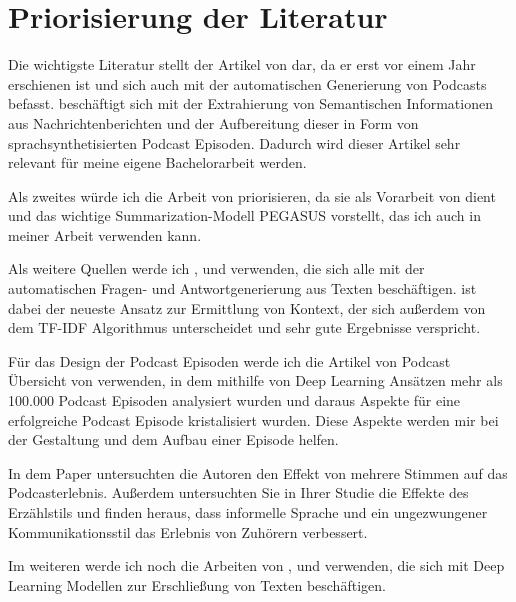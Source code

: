 \chapter{Priorisierung der Literatur}\label{ch:intro}

Die wichtigste Literatur stellt der Artikel von \cite{laban2022} dar, da er erst vor einem Jahr erschienen ist und sich auch mit der automatischen Generierung von Podcasts befasst. \cite{laban2022} beschäftigt sich mit der Extrahierung von Semantischen Informationen aus Nachrichtenberichten und der Aufbereitung dieser in Form von sprachsynthetisierten Podcast Episoden.  Dadurch wird dieser Artikel sehr relevant für meine eigene Bachelorarbeit werden. 

Als zweites würde ich die Arbeit von \cite{zhang2020} priorisieren, da sie als Vorarbeit von \cite{laban2022} dient und das wichtige Summarization-Modell PEGASUS vorstellt, das ich auch in meiner Arbeit verwenden kann.

Als weitere Quellen werde ich \cite{karpukhin2020}, \cite{reddy2019} und \cite{choi2018} verwenden, die sich alle mit der automatischen Fragen- und Antwortgenerierung aus Texten beschäftigen.
\cite{karpukhin2020} ist dabei der neueste Ansatz zur Ermittlung von Kontext, der sich außerdem von dem TF-IDF Algorithmus unterscheidet und sehr gute Ergebnisse verspricht.

Für das Design der Podcast Episoden werde ich die Artikel von Podcast Übersicht von \cite{jones2021} verwenden, in dem mithilfe von Deep Learning Ansätzen mehr als 100.000 Podcast Episoden analysiert wurden und daraus Aspekte für eine erfolgreiche Podcast Episode kristalisiert wurden. Diese Aspekte werden mir bei der Gestaltung und dem Aufbau einer Episode helfen. 

In dem Paper \cite{kang2012} untersuchten die Autoren den Effekt von mehrere Stimmen auf das Podcasterlebnis. Außerdem untersuchten Sie in Ihrer Studie die Effekte des Erzählstils und finden heraus, dass informelle Sprache und ein ungezwungener Kommunikationsstil das Erlebnis von Zuhörern verbessert. 

Im weiteren werde ich noch die Arbeiten von \cite{maroni2020}, \cite{clark2020} und \cite{du2017} verwenden, die sich mit Deep Learning Modellen zur Erschließung von Texten beschäftigen.


